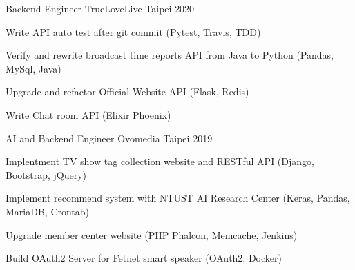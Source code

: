 

\begin{cventries}

  \cventry
    {Backend Engineer} %
    {TrueLoveLive} %
    {Taipei} %
    {2020} %
    {
      \begin{cvitems} %
        \item {Write API auto test after git commit (Pytest, Travis, TDD)}
        \item {Verify and rewrite broadcast time reports API from Java to Python (Pandas, MySql, Java)}
        \item {Upgrade and refactor Official Website API (Flask, Redis)}
        \item {Write Chat room API (Elixir Phoenix)}
      \end{cvitems}
    }

  \cventry
    {AI and Backend Engineer} %
    {Ovomedia} %
    {Taipei} %
    {2019} %
    {
      \begin{cvitems} %
        \item {Implentment TV show tag collection website and RESTful API (Django, Bootstrap, jQuery)}
        \item {Implement recommend system with NTUST AI Research Center (Keras, Pandas, MariaDB, Crontab)}
        \item {Upgrade member center website (PHP Phalcon, Memcache, Jenkins)}
        \item {Build OAuth2 Server for Fetnet smart speaker (OAuth2, Docker)}
      \end{cvitems}
    }

\end{cventries}
